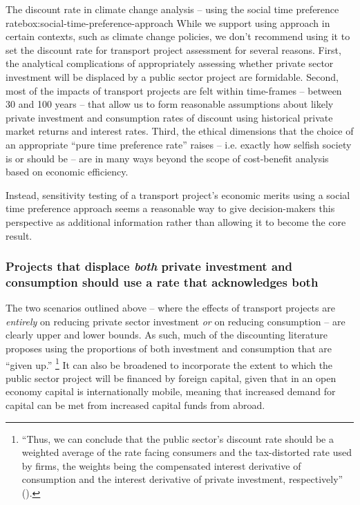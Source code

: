 \begin{bigbox}{The discount rate in climate change analysis -- using the social time preference rate}{box:social-time-preference-approach}
While we support using approach in certain contexts, such as climate change policies, we don't recommend using it to set the discount rate for transport project assessment for several reasons. First, the analytical complications of appropriately assessing whether private sector investment will be displaced by a public sector project are formidable. Second, most of the impacts of transport projects are felt within time-frames -- between 30 and 100 years -- that allow us to form reasonable assumptions about likely private investment and consumption rates of discount using historical private market returns and interest rates. Third, the ethical dimensions that the choice of an appropriate ``pure time preference rate'' raises -- i.e. exactly how selfish society is or should be -- are in many ways beyond the scope of cost-benefit analysis based on economic efficiency. 

Instead, sensitivity testing of a transport project's economic merits using a social time preference approach seems a reasonable way to give decision-makers this perspective as additional information rather than allowing it to become the core result.

\end{bigbox}


\subsubsection{Projects that displace \emph{both} private investment and consumption should use a rate that acknowledges both}

The two scenarios outlined above -- where the effects of transport projects are \emph{entirely} on reducing private sector investment \emph{or} on reducing consumption -- are clearly upper and lower bounds. As such, much of the discounting literature proposes using the proportions of both investment and consumption that are ``given up.''%
    \footnote{``Thus, we can conclude that the public sector's discount rate should be a weighted average of the rate facing consumers and the tax-distorted rate used by firms, the weights being the compensated interest derivative of consumption and the interest derivative of private investment, respectively'' (\textcite[][401]{Sandmo-and-Dreze-1971-Discount-Rates}).}
It can also be broadened to incorporate the extent to which the public sector project will be financed by foreign capital, given that in an open economy capital is internationally mobile, meaning that increased demand for capital can be met from increased capital funds from abroad.

